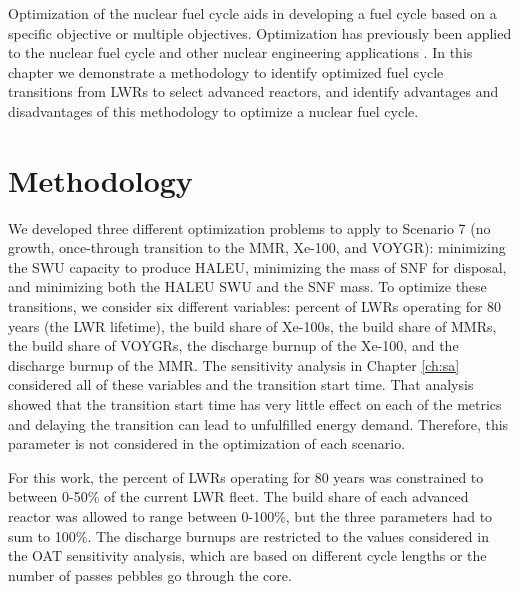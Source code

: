 Optimization of the nuclear fuel cycle aids in developing
a fuel cycle based on a specific objective or  multiple objectives. 
Optimization has previously been applied to the nuclear fuel 
cycle \cite{passerini_sensitivity_2012,andrianov_optimization_2019}
and other nuclear engineering applications 
\cite{chee_fluoride-salt-cooled_2022}.
In this chapter we demonstrate a methodology to identify
optimized fuel cycle transitions from \glspl{LWR} to select 
advanced reactors, and identify advantages and disadvantages of 
this methodology to optimize a nuclear fuel cycle. 

\section{Methodology}
We developed three different optimization problems to apply to 
Scenario 7 (no growth, once-through transition to the \gls{MMR}, Xe-100, 
and VOYGR): minimizing the \gls{SWU} capacity to 
produce \gls{HALEU}, minimizing the mass of \gls{SNF} for disposal, 
and minimizing both the \gls{HALEU} \gls{SWU} and the \gls{SNF} 
mass. To optimize these transitions, we consider six different 
variables: percent of \glspl{LWR} operating for 80 years (the \gls{LWR} 
lifetime), the build share 
of Xe-100s, the build share of \glspl{MMR}, the build share of VOYGRs, 
the discharge burnup of the Xe-100, and the discharge burnup of the 
\gls{MMR}. The sensitivity analysis in Chapter \ref{ch:sa} considered 
all of these variables and the transition start time. That analysis 
showed that the transition start time has
very little effect on each of the metrics and delaying the transition 
can lead to unfulfilled energy demand. Therefore, this parameter is 
not considered in the optimization of each scenario. 

For this work, the percent of \glspl{LWR} operating for 80 years 
was constrained to between 0-50\% of the current \gls{LWR} fleet. 
The build share of each advanced reactor was allowed to range between 
0-100\%, but the three parameters had to sum to 100\%. The discharge 
burnups are restricted to the values considered in the \gls{OAT} 
sensitivity analysis, which are based on different cycle lengths or 
the number of passes pebbles go through the core.

